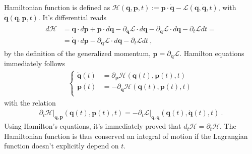 \documentclass[letterpaper,10pt,english]{jupyterBook}
\begin{document}
\sphinxAtStartPar
Hamiltonian function is defined as \(\mathcal{H}(\mathbf{q}, \mathbf{p}, t) := \mathbf{p} \cdot \dot{\mathbf{q}} - \mathcal{L}(\mathbf{q}, \dot{\mathbf{q}}, t)\), with \(\dot{\mathbf{q}}(\mathbf{q}, \mathbf{p}, t)\). It’s differential reads
\begin{equation}\label{equation:ch/quantum-mechanics/analytical-mechanics:eq:analytical:hamiltonian-differential}
\begin{split}\begin{aligned}
  d \mathcal{H}
  & = \dot{\mathbf{q}} \cdot d \mathbf{p} + \mathbf{p} \cdot d \dot{\mathbf{q}} - \partial_{\dot{\mathbf{q}}} \mathcal{L} \cdot d \dot{\mathbf{q}} - \partial_{\mathbf{q}} \mathcal{L} \cdot d \mathbf{q} - \partial_t \mathcal{L} dt = \\
  & = \dot{\mathbf{q}} \cdot d \mathbf{p} - \partial_{\mathbf{q}} \mathcal{L} \cdot d \mathbf{q} - \partial_t \mathcal{L} dt \ ,
\end{aligned}\end{split}
\end{equation}
\sphinxAtStartPar
by the definition of the generalized momentum, \(\mathbf{p} = \partial_{\dot{\mathbf{q}}} \mathcal{L}\). Hamilton equations immediately follows
\begin{equation*}
\begin{split}\left\{
\begin{aligned}
  \dot{\mathbf{q}}(t) & = \partial_{\mathbf{p}} \mathcal{H}(\mathbf{q}(t), \mathbf{p}(t), t) \\
  \dot{\mathbf{p}}(t) & =-\partial_{\mathbf{q}} \mathcal{H}(\mathbf{q}(t), \mathbf{p}(t), t) \\
\end{aligned}
\right.\end{split}
\end{equation*}
\sphinxAtStartPar
with the relation
\begin{equation*}
\begin{split}\left.\partial_t \mathcal{H}\right|_{\mathbf{q}, \mathbf{p}}(\mathbf{q}(t), \mathbf{p}(t),t) = - \left.\partial_t \mathcal{L}\right|_{\mathbf{q}, \dot{\mathbf{q}}}(\mathbf{q}(t), \dot{\mathbf{q}}(t),t) \ . \end{split}
\end{equation*}
\sphinxAtStartPar
Using Hamilton’s equations, it’s immediately proved that \(d_t \mathcal{H} = \partial_t \mathcal{H}\). The Hamiltonian function is thus conserved \sphinxhyphen{} an integral of motion \sphinxhyphen{} if the Lagrangian function doesn’t explicitly depend on \(t\).
\end{document}
